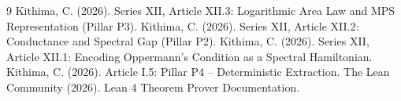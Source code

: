 \documentclass[11pt,a4paper]{article}
\begin{document}

\begin{thebibliography}{9}
  Kithima, C. (2026). Series XII, Article XII.3: Logarithmic Area Law and MPS Representation (Pillar P3).
  Kithima, C. (2026). Series XII, Article XII.2: Conductance and Spectral Gap (Pillar P2).
  Kithima, C. (2026). Series XII, Article XII.1: Encoding Oppermann's Condition as a Spectral Hamiltonian.
  Kithima, C. (2026). Article I.5: Pillar P4 – Deterministic Extraction.
  The Lean Community (2026). Lean 4 Theorem Prover Documentation.
\end{thebibliography}
\end{document}
